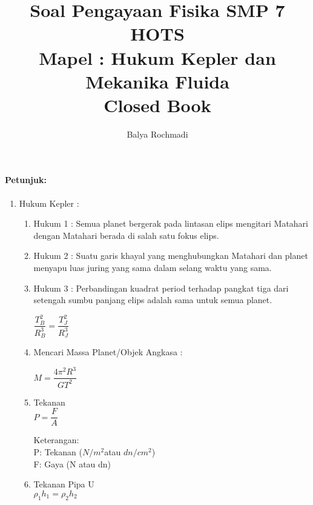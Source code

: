 \documentclass[12pt,a4paper,draft,final,oneside,twoside,openright,openany]{article}
\author{Balya Rochmadi}
\title{Soal Pengayaan Fisika SMP 7 HOTS\\Mapel : Hukum Kepler dan Mekanika Fluida \\Closed Book}
\begin{document}
	\maketitle
	\Large
	\noindent\makebox[\linewidth]{\rule{\paperwidth}{0.4pt}}
	\paragraph{Petunjuk:}
	\begin{enumerate}
		\item Hukum Kepler :
			\begin{enumerate}
				\item Hukum 1 : Semua planet bergerak pada lintasan elips mengitari Matahari dengan Matahari berada di salah satu fokus elips.
				\item Hukum 2 : Suatu garis khayal yang menghubungkan Matahari dan planet menyapu luas juring yang sama dalam selang waktu yang sama.
				\item Hukum 3 : Perbandingan kuadrat period terhadap pangkat tiga dari setengah sumbu panjang elips adalah sama untuk semua planet.\\
				\begin{center}
				$\dfrac{T_{B}^{2}}{R_{B}^{3}} =\dfrac{T_{J}^{2}}{R_{J}^{3}}$
				\end{center}
				\item Mencari Massa Planet/Objek Angkasa : \\
				\begin{center}
					 $M=\dfrac{4\pi^{2}R^{3}}{GT^{2}}$ 
				\end{center}
				\item Tekanan\\
				 $P={\dfrac {F}{A}}$
				
				Keterangan:\\
				
				P: Tekanan ($N/m^2 $atau $dn/cm^2$)\\
				F: Gaya (N atau dn)\\
				\item Tekanan Pipa U\\
					$\rho_1h_1=\rho_2h_2$
				

\end{enumerate}
\end{enumerate}
\end{document}
